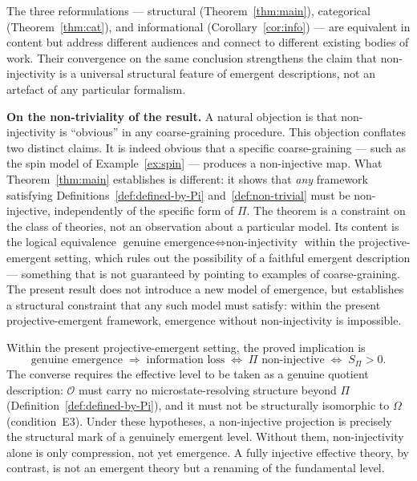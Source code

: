 \documentclass[12pt,a4paper]{article}
\begin{document}
  The three reformulations --- structural (Theorem~\ref{thm:main}), categorical
  (Theorem~\ref{thm:cat}), and informational
  (Corollary~\ref{cor:info}) --- are equivalent in content but address different
  audiences and connect to different existing bodies of work.
  Their convergence on the same conclusion strengthens the claim that
  non-injectivity is a universal structural feature of emergent descriptions,
  not an artefact of any particular formalism.

  \textbf{On the non-triviality of the result.}
  A natural objection is that non-injectivity is ``obvious'' in any
  coarse-graining procedure.
  This objection conflates two distinct claims.
  It is indeed obvious that a specific coarse-graining --- such as the spin
  model of Example~\ref{ex:spin} --- produces a non-injective map.
  What Theorem~\ref{thm:main} establishes is different: it shows that
  \emph{any} framework satisfying Definitions~\ref{def:defined-by-Pi}
  and~\ref{def:non-trivial} must be non-injective, independently of the
  specific form of $\Pi$.
  The theorem is a constraint on the class of theories, not an observation
  about a particular model.
  Its content is the logical equivalence
  $\text{genuine emergence} \Leftrightarrow \text{non-injectivity}$
  within the projective-emergent setting, which rules out the possibility of
  a faithful emergent description --- something that is not guaranteed by
  pointing to examples of coarse-graining.
  The present result does not introduce a new model of emergence, but
  establishes a structural constraint that any such model must satisfy:
  within the present projective-emergent framework, emergence without
  non-injectivity is impossible.

  Within the present projective-emergent setting, the proved implication is
  \begin{equation}
    \text{genuine emergence}
    \;\Longrightarrow\;
    \text{information loss}
    \;\Longleftrightarrow\;
    \Pi \text{ non-injective}
    \;\Longleftrightarrow\;
    S_\Pi > 0 .
    \label{eq:equivalence}
  \end{equation}
  The converse requires the effective level to be taken as a genuine quotient description: $\mathcal{O}$ must
  carry no microstate-resolving structure beyond $\Pi$ (Definition~\ref{def:defined-by-Pi}), and it must not be
  structurally isomorphic to $\Omega$ (condition~E3).
  Under these hypotheses, a non-injective projection is precisely the structural mark of a genuinely emergent
  level.
  Without them, non-injectivity alone is only compression, not yet emergence.
  A fully injective effective theory, by contrast, is not an emergent theory but a renaming of the fundamental
  level.
\end{document}
